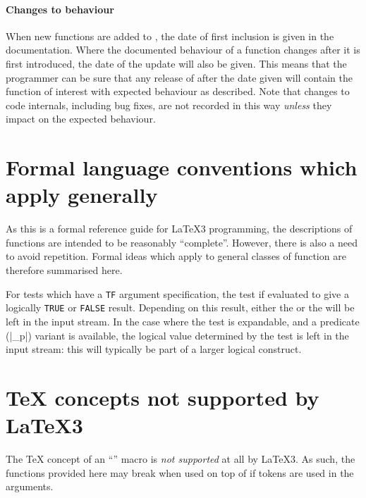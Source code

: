 \documentclass[dvipdfmx,full,kernel]{wtpl3doc}
\begin{document}
\paragraph{Changes to behaviour}
When new functions are added to , the date of first inclusion is
given in the documentation. Where the documented behaviour of a function
changes after it is first introduced, the date of the update will also be
given. This means that the programmer can be sure that any release of
 after the date given will contain the function of interest with
expected behaviour as described. Note that changes to code internals, including
bug fixes, are not recorded in this way \emph{unless} they impact on the
expected behaviour.

\section{Formal language conventions which apply generally}

As this is a formal reference guide for \LaTeX3 programming, the descriptions
of functions are intended to be reasonably \enquote{complete}. However, there
is also a need to avoid repetition. Formal ideas which apply to general
classes of function are therefore summarised here.

For tests which have a \texttt{TF} argument specification, the test if
evaluated to give a logically \texttt{TRUE} or \texttt{FALSE} result.
Depending on this result, either the  or the 
will be left in the input stream. In the case where the test is expandable,
and a predicate (|_p|) variant is available, the logical value determined by
the test is left in the input stream: this will typically be part of a larger
logical construct.

\section{\TeX{} concepts not supported by \LaTeX3{}}

The \TeX{} concept of an \enquote{} macro is \emph{not supported}
at all by \LaTeX3{}. As such, the functions provided here may break when
used on top of \LaTeXe{} if  tokens are used in the arguments.
\end{document}

